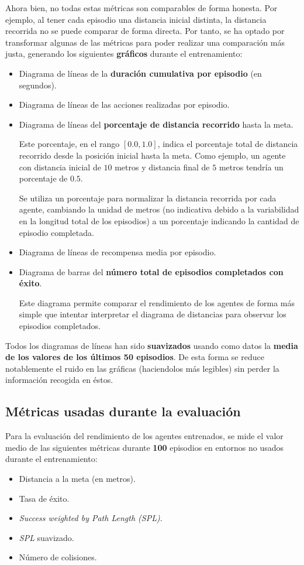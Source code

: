 Ahora bien, no todas estas métricas son comparables de forma honesta. Por ejemplo, al tener cada episodio una distancia inicial distinta, la distancia recorrida no se puede comparar de forma directa. Por tanto, se ha optado por transformar algunas de las métricas para poder realizar una comparación más justa, generando los siguientes \textbf{gráficos} durante el entrenamiento:
\begin{itemize}
	\item Diagrama de líneas de la \textbf{duración cumulativa por episodio} (en segundos).
	\item Diagrama de líneas de las acciones realizadas por episodio.
	\item Diagrama de líneas del \textbf{porcentaje de distancia recorrido} hasta la meta.
	
	Este porcentaje, en el rango $[0.0, 1.0]$, indica el porcentaje total de distancia recorrido desde la posición inicial hasta la meta. Como ejemplo, un agente con distancia inicial de $10$ metros y distancia final de $5$ metros tendría un porcentaje de $0.5$.
	
	Se utiliza un porcentaje para normalizar la distancia recorrida por cada agente, cambiando la unidad de metros (no indicativa debido a la variabilidad en la longitud total de los episodios) a un porcentaje indicando la cantidad de episodio completada.
	\item Diagrama de líneas de recompensa media por episodio.
	\item Diagrama de barras del \textbf{número total de episodios completados con éxito}.
	
	Este diagrama permite comparar el rendimiento de los agentes de forma más simple que intentar interpretar el diagrama de distancias para observar los episodios completados.
\end{itemize}

Todos los diagramas de líneas han sido \textbf{suavizados} usando como datos la \textbf{media de los valores de los últimos 50 episodios}. De esta forma se reduce notablemente el ruido en las gráficas (haciendolos más legibles) sin perder la información recogida en éstos.

\subsection{Métricas usadas durante la evaluación}

Para la evaluación del rendimiento de los agentes entrenados, se mide el valor medio de las siguientes métricas durante \textbf{100} episodios en entornos no usados durante el entrenamiento:
\begin{itemize}
	\item Distancia a la meta (en metros).
	\item Tasa de éxito.
	\item \textit{Success weighted by Path Length (SPL)}.
	\item \textit{SPL} suavizado.
	\item Número de colisiones.
\end{itemize}

